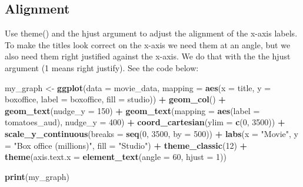 \documentclass[
]{krantz}
\makeatletter
\newenvironment{Shaded}{\begin{snugshade}}{\end{snugshade}}
\newcommand{\DataTypeTok}[1]{\textcolor[rgb]{0.27,0.27,0.27}{#1}}
\newcommand{\DecValTok}[1]{\textcolor[rgb]{0.06,0.06,0.06}{#1}}
\newcommand{\KeywordTok}[1]{\textcolor[rgb]{0.27,0.27,0.27}{\textbf{#1}}}
\newcommand{\NormalTok}[1]{#1}
\newcommand{\OperatorTok}[1]{\textcolor[rgb]{0.43,0.43,0.43}{\textbf{#1}}}
\newcommand{\StringTok}[1]{\textcolor[rgb]{0.5,0.5,0.5}{#1}}
\newenvironment{kframe}{%
\medskip{}
\setlength{\fboxsep}{.8em}
 \def\at@end@of@kframe{}%
 \ifinner\ifhmode%
  \def\at@end@of@kframe{\end{minipage}}%
  \begin{minipage}{\columnwidth}%
 \fi\fi%
 \def\FrameCommand##1{\hskip\@totalleftmargin \hskip-\fboxsep
 \colorbox{shadecolor}{##1}\hskip-\fboxsep
     \hskip-\linewidth \hskip-\@totalleftmargin \hskip\columnwidth}%
 \MakeFramed {\advance\hsize-\width
   \@totalleftmargin\z@ \linewidth\hsize
   \@setminipage}}%
 {\par\unskip\endMakeFramed%
 \at@end@of@kframe}
\renewenvironment{Shaded}{\begin{kframe}}{\end{kframe}}
\makeatother
\begin{document}
\hypertarget{alignment}{%
\subsection{Alignment}\label{alignment}}

Use theme() and the hjust argument to adjust the alignment of the x-axis labels. To make the titles look correct on the x-axis we need them at an angle, but we also need them right justified against the x-axis. We do that with the the hjust argument (1 means right justify). See the code below:

\begin{Shaded}
\begin{Highlighting}[]
\NormalTok{my_graph <-}\StringTok{ }\KeywordTok{ggplot}\NormalTok{(}\DataTypeTok{data =}\NormalTok{ movie_data,}
           \DataTypeTok{mapping =} \KeywordTok{aes}\NormalTok{(}\DataTypeTok{x =}\NormalTok{ title,}
                         \DataTypeTok{y =}\NormalTok{ boxoffice,}
                         \DataTypeTok{label =}\NormalTok{ boxoffice, }
                         \DataTypeTok{fill =}\NormalTok{ studio)) }\OperatorTok{+}
\StringTok{  }\KeywordTok{geom_col}\NormalTok{() }\OperatorTok{+}
\StringTok{  }\KeywordTok{geom_text}\NormalTok{(}\DataTypeTok{nudge_y =} \DecValTok{150}\NormalTok{)  }\OperatorTok{+}
\StringTok{  }\KeywordTok{geom_text}\NormalTok{(}\DataTypeTok{mapping =} \KeywordTok{aes}\NormalTok{(}\DataTypeTok{label =}\NormalTok{ tomatoes_aud), }
            \DataTypeTok{nudge_y =} \DecValTok{400}\NormalTok{) }\OperatorTok{+}
\StringTok{  }\KeywordTok{coord_cartesian}\NormalTok{(}\DataTypeTok{ylim =} \KeywordTok{c}\NormalTok{(}\DecValTok{0}\NormalTok{, }\DecValTok{3500}\NormalTok{)) }\OperatorTok{+}
\StringTok{  }\KeywordTok{scale_y_continuous}\NormalTok{(}\DataTypeTok{breaks =} \KeywordTok{seq}\NormalTok{(}\DecValTok{0}\NormalTok{, }\DecValTok{3500}\NormalTok{, }\DataTypeTok{by =} \DecValTok{500}\NormalTok{)) }\OperatorTok{+}
\StringTok{  }\KeywordTok{labs}\NormalTok{(}\DataTypeTok{x =} \StringTok{"Movie"}\NormalTok{,}
       \DataTypeTok{y =} \StringTok{"Box office (millions)"}\NormalTok{,}
       \DataTypeTok{fill =} \StringTok{"Studio"}\NormalTok{) }\OperatorTok{+}
\StringTok{  }\KeywordTok{theme_classic}\NormalTok{(}\DecValTok{12}\NormalTok{) }\OperatorTok{+}
\StringTok{  }\KeywordTok{theme}\NormalTok{(}\DataTypeTok{axis.text.x =} \KeywordTok{element_text}\NormalTok{(}\DataTypeTok{angle =} \DecValTok{60}\NormalTok{, }
                                   \DataTypeTok{hjust =} \DecValTok{1}\NormalTok{))  }

\KeywordTok{print}\NormalTok{(my_graph)}
\end{Highlighting}
\end{Shaded}
\end{document}
